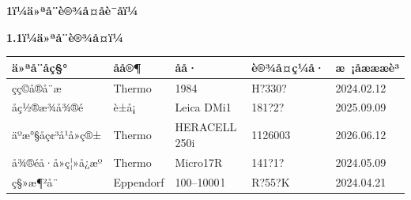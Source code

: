 \documentclass[UTF8,10pt,a4paper,fontset=fandol]{ctexart}
\newcommand{\fieldvalue}[1]{#1}
\newcommand{\handwritten}[1]{#1}
\begin{document}
\textbf{1ï¼ä»ªå¨è®¾å¤åè¯åï¼}

\textbf{1.1ï¼ä»ªå¨è®¾å¤ï¼}

\small
\begin{tabularx}{\textwidth}{|X|X|X|X|X|}
\hline
ä»ªå¨åç§° & åå®¶ & åå· & è®¾å¤ç¼å· & æ ¡åæææè³ \\ \hline
\fieldvalue{çç©å®å¨æ} &
\fieldvalue{Thermo} &
\fieldvalue{\handwritten{1984}} &
\fieldvalue{\handwritten{H?330?}} &
\fieldvalue{\handwritten{2024.02.12}}
\\ \hline
\fieldvalue{åç½®æ¾å¾®é} &
\fieldvalue{è±å¡} &
\fieldvalue{Leica DMi1} &
\fieldvalue{\handwritten{181?2?}} &
\fieldvalue{\handwritten{2025.09.09}}
\\ \hline
\fieldvalue{äºæ°§åç¢³å¹å»ç®±} &
\fieldvalue{Thermo} &
\fieldvalue{HERACELL 250i} &
\fieldvalue{\handwritten{1126003}} &
\fieldvalue{\handwritten{2026.06.12}}
\\ \hline
\fieldvalue{å¾®éå·å»ç¦»å¿æº} &
\fieldvalue{Thermo} &
\fieldvalue{Micro17R} &
\fieldvalue{\handwritten{141?1?}} &
\fieldvalue{\handwritten{2024.05.09}}
\\ \hline
\fieldvalue{ç§»æ¶²å¨} &
\fieldvalue{Eppendorf} &
\fieldvalue{\handwritten{100--1000\,\textmu l}} &
\fieldvalue{\handwritten{R?55?K}} &
\fieldvalue{\handwritten{2024.04.21}}
\\ \hline
\end{tabularx}
\normalsize
\end{document}
